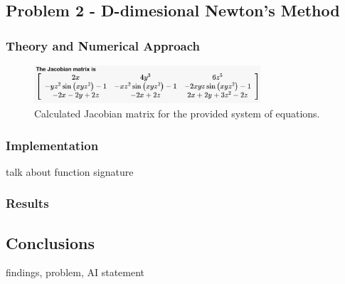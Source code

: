 \documentclass[10pt]{article}
\begin{document}
\pagebreak

\subsection*{Problem 2 - D-dimesional Newton's Method}

\subsubsection*{Theory and Numerical Approach}

\begin{figure}[h!]
\centering
\includegraphics[width=0.75\textwidth]{Jacobian.png}
\caption{Calculated Jacobian matrix for the provided system of equations.}
\end{figure}

\subsubsection*{Implementation}
talk about function signature

\subsubsection*{Results}

\pagebreak

\subsection*{Conclusions}
findings, problem, AI statement

\pagebreak

\end{document}
